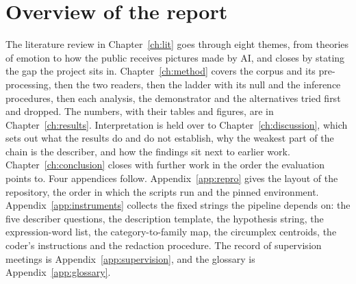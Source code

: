\section{Overview of the report}
\label{sec:intro-overview}

The literature review in Chapter~\ref{ch:lit} goes through eight themes, from theories of emotion to how the public receives pictures made by AI, and closes by stating the gap the project sits in. Chapter~\ref{ch:method} covers the corpus and its pre-processing, then the two readers, then the ladder with its null and the inference procedures, then each analysis, the demonstrator and the alternatives tried first and dropped. The numbers, with their tables and figures, are in Chapter~\ref{ch:results}. Interpretation is held over to Chapter~\ref{ch:discussion}, which sets out what the results do and do not establish, why the weakest part of the chain is the describer, and how the findings sit next to earlier work. Chapter~\ref{ch:conclusion} closes with further work in the order the evaluation points to. Four appendices follow. Appendix~\ref{app:repro} gives the layout of the repository, the order in which the scripts run and the pinned environment. Appendix~\ref{app:instruments} collects the fixed strings the pipeline depends on: the five describer questions, the description template, the hypothesis string, the expression-word list, the category-to-family map, the circumplex centroids, the coder's instructions and the redaction procedure. The record of supervision meetings is Appendix~\ref{app:supervision}, and the glossary is Appendix~\ref{app:glossary}.
